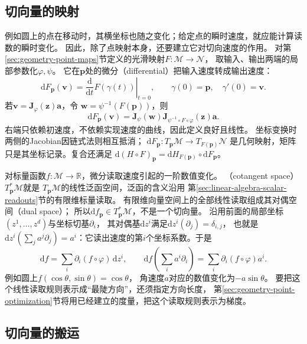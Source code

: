 \subsection{切向量的映射}
\label{sec:geometry-tangent-maps}

例如圆上的点在移动时，其横坐标也随之变化；给定点的瞬时速度，就应能计算读数的瞬时变化。
因此，除了点映射本身，还要建立它对切向速度的作用。
对第\ref{sec:geometry-point-maps}节定义的光滑映射$F:\mathcal M\to\mathcal N$，
取输入、输出两端的局部参数化$\varphi,\psi$。
它在$\bm p$处的微分（differential）把输入速度转成输出速度：
\[
 \mathrm dF_{\bm p}(\bm v)
 =\left.\frac{\mathrm d}{\mathrm dt}F(\gamma(t))\right|_{t=0},
 \qquad\gamma(0)=\bm p,\quad\gamma'(0)=\bm v.
\]
若$\bm v=\bm J_\varphi(\bm z)\bm a$，令
$\bm w=\psi^{-1}(F(\bm p))$，则
\begin{equation}
 \mathrm dF_{\bm p}(\bm v)
 =\bm J_\psi(\bm w)
   \bm J_{\psi^{-1}\circ F\circ\varphi}(\bm z)\bm a.
 \label{eq:geometry-map-differential}
\end{equation}
右端只依赖初速度，不依赖实现速度的曲线，因此定义良好且线性。
坐标变换时两侧的Jacobian因链式法则相互抵消；
$\mathrm dF_{\bm p}:T_{\bm p}\mathcal M\to T_{F(\bm p)}\mathcal N$
是几何映射，矩阵只是其坐标记录。复合还满足
$\mathrm d(H\circ F)_{\bm p}=\mathrm dH_{F(\bm p)}\circ\mathrm dF_{\bm p}$。

对标量函数$f:\mathcal M\to\mathbb R$，微分读取速度引起的一阶数值变化。
（cotangent space）$T_{\bm p}^*\mathcal M$就是
$T_{\bm p}\mathcal M$的线性泛函空间，泛函的含义沿用
第\ref{sec:linear-algebra-scalar-readouts}节的有限维标量读取。
有限维向量空间上的全部线性读取组成其对偶空间（dual space）；
所以$\mathrm df_{\bm p}\in T_{\bm p}^*\mathcal M$，不是一个切向量。
沿用前面的局部坐标$(z^1,\ldots,z^d)$与坐标切基$\partial_i$，
其对偶基$\mathrm dz^i$满足$\mathrm dz^i(\partial_j)=\delta_{i,j}$，
也就是$\mathrm dz^i(\sum_j a^j\partial_j)=a^i$：它读出速度的第$i$个坐标系数。于是
\[
 \mathrm df=\sum_i\partial_i(f\circ\varphi)\,\mathrm dz^i,\qquad
 \mathrm df\!\left(\sum_i a^i\partial_i\right)
 =\sum_i\partial_i(f\circ\varphi)a^i.
\]
例如圆上$f(\cos\theta,\sin\theta)=\cos\theta$，
角速度$a$对应的数值变化为$-a\sin\theta$。
要把这个线性读取规则表示成“最陡方向”，还须指定方向长度，
第\ref{sec:geometry-point-optimization}节将用已经建立的度量，把这个读取规则表示为梯度。

\subsection{切向量的搬运}
\label{sec:geometry-tangent-transport}
\label{sec:geometry-connection-comparison}
\label{sec:geometry-riemannian-curvature}

